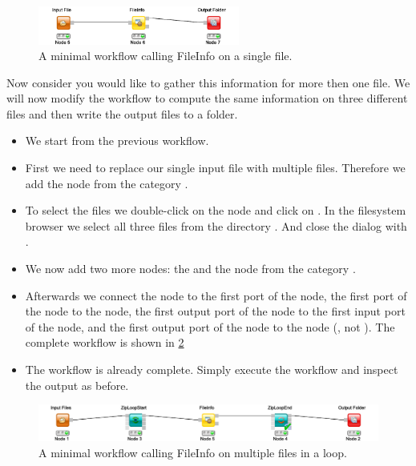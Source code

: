 \begin{figure}
\centering
\includegraphics[width=0.59\textwidth]{graphics/knime_setup/Minimal_FileInfo}
\caption{A minimal workflow calling FileInfo on a single file.}
\label{fig:knime_minimal}
\end{figure}

Now consider you would like to gather this information for more then one file.
We will now modify the workflow to compute the same information on three different files and then write the output files to a folder.

\begin{itemize}
\item
We start from the previous workflow.
\item
First we need to replace our single input file with multiple files.
Therefore we add the  node from the category .
\item
To select the files we double-click on the  node and click on .
In the filesystem browser we select all three files from the directory .
And close the dialog with .
\item
We now add two more nodes: the  and the  node from the category .
\item
Afterwards we connect the  node to the first port of the  node, the first port of the  node to the  node, the first output port of the  node to the first input port of the  node, and the first output port of the  node to the  node (, not ).
The complete workflow is shown in \cref{fig:knime_minimal_loop}
\item
The workflow is already complete.
Simply execute the workflow and inspect the output as before.
\end{itemize}

\begin{figure}
\centering
\includegraphics[width=\textwidth]{graphics/knime_setup/Minimal_FileInfoLoop}
\caption{A minimal workflow calling FileInfo on multiple files in a loop.}
\label{fig:knime_minimal_loop}
\end{figure}
